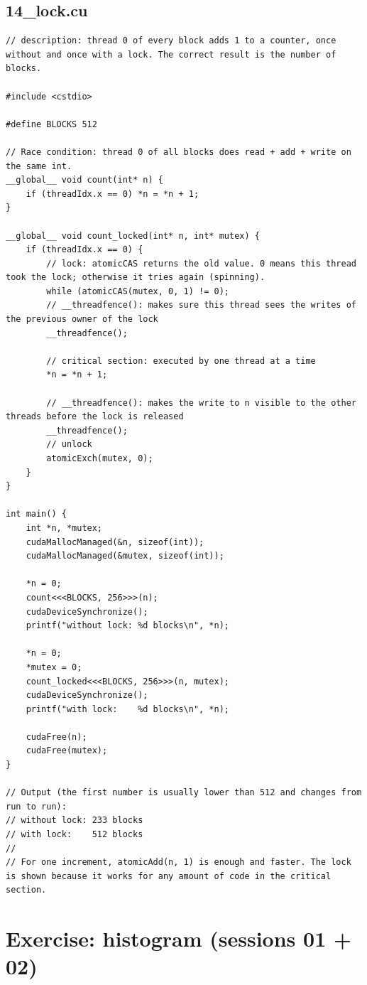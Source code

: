 \documentclass[main.tex]{subfiles}
\begin{document}
\subsection{14\_lock.cu}
\begin{lstlisting}[language=CUDA]
// description: thread 0 of every block adds 1 to a counter, once without and once with a lock. The correct result is the number of blocks.

#include <cstdio>

#define BLOCKS 512

// Race condition: thread 0 of all blocks does read + add + write on the same int.
__global__ void count(int* n) {
    if (threadIdx.x == 0) *n = *n + 1;
}

__global__ void count_locked(int* n, int* mutex) {
    if (threadIdx.x == 0) {
        // lock: atomicCAS returns the old value. 0 means this thread took the lock; otherwise it tries again (spinning).
        while (atomicCAS(mutex, 0, 1) != 0);
        // __threadfence(): makes sure this thread sees the writes of the previous owner of the lock
        __threadfence();

        // critical section: executed by one thread at a time
        *n = *n + 1;

        // __threadfence(): makes the write to n visible to the other threads before the lock is released
        __threadfence();
        // unlock
        atomicExch(mutex, 0);
    }
}

int main() {
    int *n, *mutex;
    cudaMallocManaged(&n, sizeof(int));
    cudaMallocManaged(&mutex, sizeof(int));

    *n = 0;
    count<<<BLOCKS, 256>>>(n);
    cudaDeviceSynchronize();
    printf("without lock: %d blocks\n", *n);

    *n = 0;
    *mutex = 0;
    count_locked<<<BLOCKS, 256>>>(n, mutex);
    cudaDeviceSynchronize();
    printf("with lock:    %d blocks\n", *n);

    cudaFree(n);
    cudaFree(mutex);
}

// Output (the first number is usually lower than 512 and changes from run to run):
// without lock: 233 blocks
// with lock:    512 blocks
//
// For one increment, atomicAdd(n, 1) is enough and faster. The lock is shown because it works for any amount of code in the critical section.
\end{lstlisting}

\section{Exercise: histogram (sessions 01 + 02)}
\label{sec:histogram}
\end{document}
